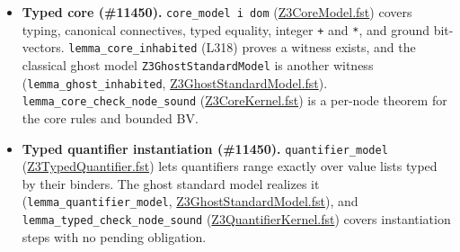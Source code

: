 \documentclass[10pt,a4paper]{article}
\begin{document}
\begin{itemize}\setlength{\itemsep}{1pt}\setlength{\parskip}{0pt}

\item \textbf{Typed core (\#11450).} \texttt{core\_\allowbreak{}model i dom} (\href{https://github.com/Z3Prover/z3/blob/8fbb275aba0472e862e289c7af1331b3bd5d512c/fstar/Z3CoreModel.fst\#L183-L186}{Z3Core\allowbreak{}Model.\allowbreak{}fst}) covers typing, canonical connectives, typed equality, integer \texttt{+} and \texttt{*}, and ground bit-vectors. \texttt{lemma\_\allowbreak{}core\_\allowbreak{}inhabited} (L318) proves a witness exists, and the classical ghost model \texttt{Z3GhostStandardM\allowbreak{}odel} is another witness (\texttt{lemma\_\allowbreak{}ghost\_\allowbreak{}inhabited}, \href{https://github.com/Z3Prover/z3/blob/8fbb275aba0472e862e289c7af1331b3bd5d512c/fstar/Z3GhostStandardModel.fst\#L479}{Z3Ghost\allowbreak{}Standard\allowbreak{}Model.\allowbreak{}fst}). \texttt{lemma\_\allowbreak{}core\_\allowbreak{}check\_\allowbreak{}node\_\allowbreak{}sound} (\href{https://github.com/Z3Prover/z3/blob/8fbb275aba0472e862e289c7af1331b3bd5d512c/fstar/Z3CoreKernel.fst\#L482-L526}{Z3Core\allowbreak{}Kernel.\allowbreak{}fst}) is a per-node theorem for the core rules and bounded BV.

\item \textbf{Typed quantifier instantiation (\#11450).} \texttt{quantifier\_\allowbreak{}model} (\href{https://github.com/Z3Prover/z3/blob/8fbb275aba0472e862e289c7af1331b3bd5d512c/fstar/Z3TypedQuantifier.fst\#L45-L53}{Z3Typed\allowbreak{}Quantifier.\allowbreak{}fst}) lets quantifiers range exactly over value lists typed by their binders. The ghost standard model realizes it (\texttt{lemma\_\allowbreak{}quantifier\_\allowbreak{}model}, \href{https://github.com/Z3Prover/z3/blob/8fbb275aba0472e862e289c7af1331b3bd5d512c/fstar/Z3GhostStandardModel.fst\#L486-L491}{Z3Ghost\allowbreak{}Standard\allowbreak{}Model.\allowbreak{}fst}), and \texttt{lemma\_\allowbreak{}typed\_\allowbreak{}check\_\allowbreak{}node\_\allowbreak{}sound} (\href{https://github.com/Z3Prover/z3/blob/8fbb275aba0472e862e289c7af1331b3bd5d512c/fstar/Z3QuantifierKernel.fst\#L181-L192}{Z3Quantifier\allowbreak{}Kernel.\allowbreak{}fst}) covers instantiation steps with no pending obligation.


\end{itemize}
\end{document}
